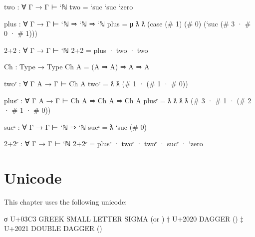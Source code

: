 \begin{fence}
\begin{code}
two : ∀ {Γ} → Γ ⊢ `ℕ
two = `suc `suc `zero

plus : ∀ {Γ} → Γ ⊢ `ℕ ⇒ `ℕ ⇒ `ℕ
plus = μ ƛ ƛ (case (# 1) (# 0) (`suc (# 3 · # 0 · # 1)))

2+2 : ∀ {Γ} → Γ ⊢ `ℕ
2+2 = plus · two · two

Ch : Type → Type
Ch A  =  (A ⇒ A) ⇒ A ⇒ A

twoᶜ : ∀ {Γ A} → Γ ⊢ Ch A
twoᶜ = ƛ ƛ (# 1 · (# 1 · # 0))

plusᶜ : ∀ {Γ A} → Γ ⊢ Ch A ⇒ Ch A ⇒ Ch A
plusᶜ = ƛ ƛ ƛ ƛ (# 3 · # 1 · (# 2 · # 1 · # 0))

sucᶜ : ∀ {Γ} → Γ ⊢ `ℕ ⇒ `ℕ
sucᶜ = ƛ `suc (# 0)

2+2ᶜ : ∀ {Γ} → Γ ⊢ `ℕ
2+2ᶜ = plusᶜ · twoᶜ · twoᶜ · sucᶜ · `zero
\end{code}
\end{fence}

\hypertarget{unicode}{%
\section{Unicode}\label{unicode}}

This chapter uses the following unicode:

\begin{myDisplay}
σ  U+03C3  GREEK SMALL LETTER SIGMA (\Gs or \sigma)
†  U+2020  DAGGER (\dag)
‡  U+2021  DOUBLE DAGGER (\ddag)
\end{myDisplay}

